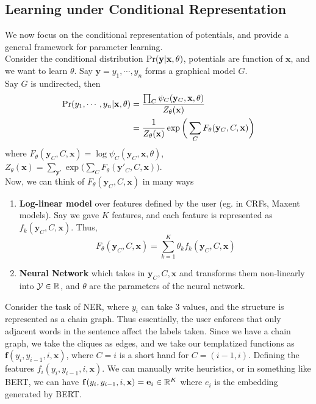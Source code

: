 \subsection{Learning under Conditional Representation}
We now focus on the conditional representation of potentials, and provide a general framework for parameter learning. \\
Consider the conditional distribution $\text{Pr}(\mathbf y|\mathbf x, \theta)$, potentials are function of $\mathbf{x}$, and we want to learn $\theta$. Say $\mathbf y = y_1, \cdots, y_n$ forms a graphical model $G$. \\
Say $G$ is undirected, then
\begin{equation}
\begin{split}
	\text{Pr}(y_1, \cdots, y_n | \mathbf x, \theta) &= \dfrac{\prod_C \psi_C(\mathbf y_C, \mathbf x, \theta)}{Z_\theta(\mathbf x)} \\&= \dfrac{1}{Z_\theta(\mathbf x)}\exp\bigg(\sum_C F_\theta(\mathbf y_C, C, \mathbf x)\bigg)
\end{split}
\end{equation} 
where $F_\theta(\mathbf y_C, C, \mathbf x) = \log \psi_C (\mathbf y_C, \mathbf x, \theta)$, $Z_\theta(\mathbf x) = \sum_{\mathbf y'} \exp\bigg(\sum_C F_\theta(\mathbf y'_C, C, \mathbf x)\bigg)$. \\
Now, we can think of $F_\theta(\mathbf y_C, C, \mathbf x)$ in many ways
\begin{enumerate}
	\item \textbf{Log-linear model} over features defined by the user (eg. in CRFs, Maxent models). Say we gave $K$ features, and each feature is represented as $f_k(\mathbf y_C, C, \mathbf x)$. Thus, 
	\begin{equation}
		F_\theta(\mathbf y_C, C, \mathbf x) = \sum_{k=1}^K \theta_k f_k(\mathbf y_C, C, \mathbf x) 
	\end{equation}
   \item \textbf{Neural Network} which takes in $\mathbf y_C, C, \mathbf x$ and transforms them non-linearly into $\mathcal{Y} \in \mathbb{R}$, and $\theta$ are the parameters of the neural network.
\end{enumerate}
\begin{exmp}
Consider the task of NER, where $y_i$ can take 3 values, and the structure is represented as a chain graph. Thus essentially, the user enforces that only adjacent words in the sentence affect the labels taken. Since we have a chain graph, we take the cliques as edges, and we take our templatized functions as $\mathbf{f}(y_i, y_{i-1}, i, \mathbf{x})$, where $C=i$ is a short hand for $C = (i-1, i)$. Defining the features $f_i(y_i, y_{i-1}, i, \mathbf{x})$. We can manually write heuristics, or in something like BERT, we can have $\mathbf{f}(y_i, y_{i-1}, i, \mathbf x) = \mathbf e_i \in \mathbb{R}^K$ where $e_i$ is the embedding generated by BERT.
\end{exmp}

